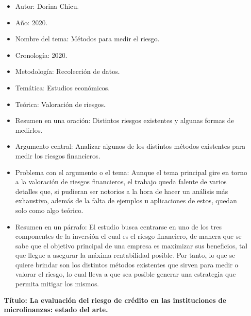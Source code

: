 \documentclass[
  letterpaper,
  DIV=11,
  numbers=noendperiod]{scrreprt}
\begin{document}
\begin{itemize}
\item
  Autor: Dorina Chicu.
\item
  Año: 2020.
\item
  Nombre del tema: Métodos para medir el riesgo.
\item
  Cronología: 2020.
\item
  Metodología: Recolección de datos.
\item
  Temática: Estudios económicos.
\item
  Teórica: Valoración de riesgos.
\item
  Resumen en una oración: Distintos riesgos existentes y algunas formas
  de medirlos.
\item
  Argumento central: Analizar algunos de los distintos métodos
  existentes para medir los riesgos financieros.
\item
  Problema con el argumento o el tema: Aunque el tema principal gire en
  torno a la valoración de riesgos financieros, el trabajo queda falente
  de varios detalles que, si pudieran ser notorios a la hora de hacer un
  análisis más exhaustivo, además de la falta de ejemplos u aplicaciones
  de estos, quedan solo como algo teórico.
\item
  Resumen en un párrafo: El estudio busca centrarse en uno de los tres
  componentes de la inversión el cual es el riesgo financiero, de manera
  que se sabe que el objetivo principal de una empresa es maximizar sus
  beneficios, tal que llegue a asegurar la máxima rentabilidad posible.
  Por tanto, lo que se quiere brindar son los distintos métodos
  existentes que sirven para medir o valorar el riesgo, lo cual lleva a
  que sea posible generar una estrategia que permita mitigar los mismos.
\end{itemize}

\textbf{Título: La evaluación del riesgo de crédito en las instituciones
de microfinanzas: estado del arte. }
\end{document}
